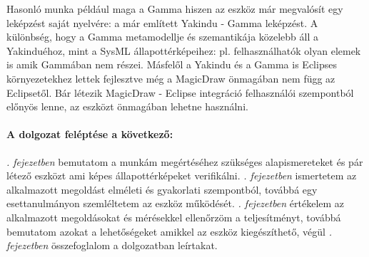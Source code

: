 Hasonló munka például maga a Gamma hiszen az eszköz már megvalósít egy leképzést saját nyelvére: a már említett Yakindu - Gamma leképzést. A különbség, hogy a Gamma metamodellje és szemantikája közelebb áll a Yakinduéhoz, mint a SysML állapottérképeihez: pl. felhasználhatók olyan elemek is amik Gammában nem részei. Másfelől a Yakindu és a Gamma is Eclipses környezetekhez lettek fejlesztve még a MagicDraw önmagában nem függ az Eclipsetől. Bár létezik MagicDraw - Eclipse integráció felhasználói szempontból előnyös lenne, az eszközt önmagában lehetne használni.

\paragraph{A dolgozat feléptése a következő:} \emph{. fejezetben} bemutatom a munkám megértéséhez szükséges alapismereteket és pár létező eszközt ami képes állapottérképeket verifikálni. \emph{. fejezetben} ismertetem az alkalmazott megoldást elméleti és gyakorlati szempontból, továbbá egy esettanulmányon szemléltetem az eszköz működését. \emph{. fejezetben} értékelem az alkalmazott megoldásokat és mérésekkel ellenőrzöm a teljesítményt, továbbá bemutatom azokat a lehetőségeket amikkel az eszköz kiegészíthető, végül \emph{. fejezetben} összefoglalom a dolgozatban leírtakat.

